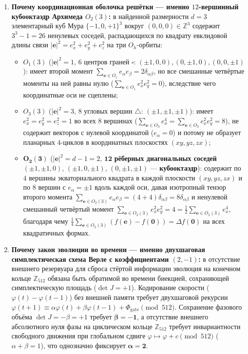 \documentclass[11pt,a4paper]{article}
\theoremstyle{plain}
\theoremstyle{definition}
\begin{document}
\begin{enumerate}[label=\textbf{Шаг \arabic*.},leftmargin=*]
\item \textbf{Почему координационная оболочка решётки --- именно $12$-вершинный кубооктаэдр Архимеда $O_2(3)$:}
  в найденной размерности $d = 3$ элементарный куб Мура $\{-1,0,+1\}^3$ вокруг $(0,0,0)\in\mathbb{Z}^3$ содержит $3^3 - 1 = 26$ ненулевых соседей, распадающихся по квадрату евклидовой длины связи $|\mathbf{e}|^2 = e_x^2 + e_y^2 + e_z^2$ на три $O_h$-орбиты:
  \begin{itemize}[noitemsep]
  \item $O_1(3)$ ($|\mathbf{e}|^2 = 1$, $6$ центров граней $\square$: $(\pm 1,0,0),(0,\pm 1,0),(0,0,\pm 1)$): имеет второй момент $\sum_{\mathbf{e}\in O_1} e_\alpha e_\beta = 2\delta_{\alpha\beta}$, но все смешанные четвёртые моменты на ней равны нулю ($\sum_{\mathbf{e}\in O_1} e_x^2 e_y^2 = 0$), вследствие чего координатные оси не сцеплены;
  \item $O_3(3)$ ($|\mathbf{e}|^2 = 3$, $8$ угловых вершин $\triangle$: $(\pm 1,\pm 1,\pm 1)$): имеет $e_x^2 = e_y^2 = e_z^2 = 1$ во всех $8$ вершинах ($\sum_{\mathbf{e}\in O_3} e_x^4 = \sum_{\mathbf{e}\in O_3} e_x^2 e_y^2 = 8$), не содержит векторов с нулевой координатой ($e_\alpha = 0$) и потому не образует планарных $4$-циклов в координатных плоскостях $(xy,yz,zx)$;
  \item $\mathbf{O_2(3)}$ ($|\mathbf{e}|^2 = d - 1 = 2$, $\mathbf{12}$ \textbf{рёберных диагональных соседей} $(\pm 1,\pm 1,0)$, $(\pm 1,0,\pm 1)$, $(0,\pm 1,\pm 1)$ --- \textbf{кубооктаэдр}): содержит по $4$ вершины экваториального квадрата в каждой плоскости $(xy,yz,zx)$ и по $8$ вершин с $e_\alpha = \pm 1$ вдоль каждой оси, давая изотропный тензор второго момента $\sum_{\mathbf{e}\in O_2(3)} e_\alpha e_\beta = (4+4)\delta_{\alpha\beta} = 8\delta_{\alpha\beta}$ и ненулевой смешанный четвёртый момент $\sum_{\mathbf{e}\in O_2(3)} e_x^2 e_y^2 = 4 = \frac{1}{2}\sum_{\mathbf{e}\in O_2(3)} e_x^4$, благодаря чему $\frac{1}{4}\sum_{\mathbf{e}\in O_2(3)}(f(\mathbf{e})-f(\mathbf{0})) = \Delta f(\mathbf{0})$ на всех квадратичных формах.
  \end{itemize}

\item \textbf{Почему закон эволюции во времени --- именно двухшаговая симплектическая схема Верле с коэффициентами $(2,-1)$:}
  в отсутствие внешнего резервуара для сброса стёртой информации эволюция на конечном кольце $\mathbb{Z}_{512}$ обязана быть обратимой во времени биекцией, сохраняющей симплектическую площадь ($\det J = +1$). Кодирование скорости ($\varphi(t)-\varphi(t-1)$) без внешней памяти требует двухшаговой рекурсии $\varphi(t+1)\equiv \alpha\varphi(t)+\beta\varphi(t-1)+\Phi_{\mathrm{gate}}\pmod{512}$. Сохранение фазового объёма $\det J = -\beta = +1$ требует $\mathbf{\beta = -1}$, а отсутствие внешнего абсолютного нуля фазы на циклическом кольце $\mathbb{Z}_{512}$ требует инвариантности свободного движения при глобальном сдвиге $\varphi\mapsto\varphi + c\pmod{512}$ ($\alpha+\beta = 1$), что однозначно фиксирует $\mathbf{\alpha = 2}$.
\end{enumerate}
\end{document}
